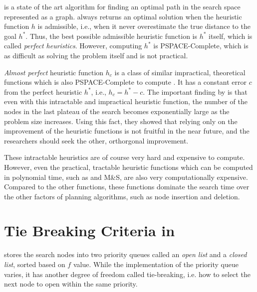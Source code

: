 
\astar is a state of the art algorithm for finding an optimal path in the
search space represented as a graph. 
\astar always returns an optimal solution when the heuristic function $h$ is
admissible, i.e., when it never overestimate the true distance to the goal
$h^*$.
% 
Thus, the best possible admissible heuristic function is $h^*$ itself, which is
called \emph{perfect heuristics}. However, computing $h^*$ is PSPACE-Complete,
which is as difficult as solving the problem itself and is not
practical.


\emph{Almost perfect} heuristic function $h_c$ is a class of similar
impractical, theoretical functions which is also PSPACE-Complete to
compute \cite{helmert2008good}.  It has a constant error $c$ from the
perfect heuristic $h^*$, i.e., $h_c=h^*-c$.  The important finding by
\citeauthor{helmert2008good} is that even with this intractable and
impractical heuristic function, the number of the nodes in the last
plateau of the search becomes exponentially large as the problem size
increases.  Using this fact, they showed that relying only on the
improvement of the heuristic functions is not fruitful in the near
future, and the researchers should seek the other,
orthorgonal improvement.

These intractable heuristics are of course very hard and expensive to
compute. However, even the practical, tractable heuristic functions
which can be computed in polynomial time, such as \lmcut and M\&S, are
also very computationally expensive. Compared to the other functions,
these functions dominate the search time over the other factors of
planning algorithms, such as node insertion and deletion.

\section{Tie Breaking Criteria in \astar}


\astar stores the search nodes into two priority queues called an \emph{open list} and a \emph{closed list}, sorted based on $f$ value. While the implementation of the priority queue varies, it has another degree of freedom called tie-breaking, i.e. how to select the next node to open within the same priority.

